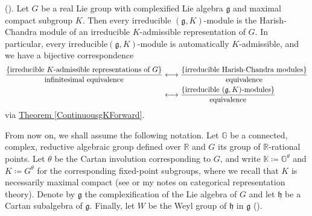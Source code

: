
\noindent\begin{theorem}\textup{(\cite[Theorem 0.3.10]{Vog81}).} Let $G$ be a real Lie group with complexified Lie algebra $\mathfrak{g}$ and maximal compact subgroup $K$. Then every irreducible $(\mathfrak{g}, K)$-module is the Harish-Chandra module of an irreducible $K$-admissible representation of $G$. In particular, every irreducible\linebreak $(\mathfrak{g}, K)$-module is automatically $K$-admissible, and we have a bijective correspondence
\begin{align*}
\begin{split}
\frac{\{\textup{irreducible $K$-admissible representations of $G$}\}}{\textup{infinitesimal equivalence}} &\longleftrightarrow \frac{\{\textup{irreducible Harish-Chandra modules}\}}{\textup{equivalence}}\\
&\longleftrightarrow \frac{\{\textup{irreducible $(\mathfrak{g}, K)$-modules}\}}{\textup{equivalence}}
\end{split}
\end{align*}
\noindent via \hyperref[ContinuousgKForward]{Theorem \ref*{ContinuousgKForward}}.\\
\end{theorem}

\noindent From now on, we shall assume the following notation. Let $\mathbb{G}$ be a connected, complex, reductive algebraic group defined over $\mathbb{R}$ and $G$ its group of $\mathbb{R}$-rational points. Let $\theta$ be the Cartan involution corresponding to $G$, and write $\mathbb{K} \coloneqq \mathbb{G}^\theta$ and $K \coloneqq G^\theta$ for the corresponding fixed-point subgroups, where we recall that $K$ is necessarily maximal compact (see \cite[\S 3]{AC09} or my notes on categorical representation theory). Denote by $\mathfrak{g}$ the complexification of the Lie algebra of $G$ and let $\mathfrak{h}$ be a Cartan subalgebra of $\mathfrak{g}$. Finally, let $W$ be the Weyl group of $\mathfrak{h}$ in $\mathfrak{g}$ (\cite[Definition 0.2.5]{Vog81}).\\

